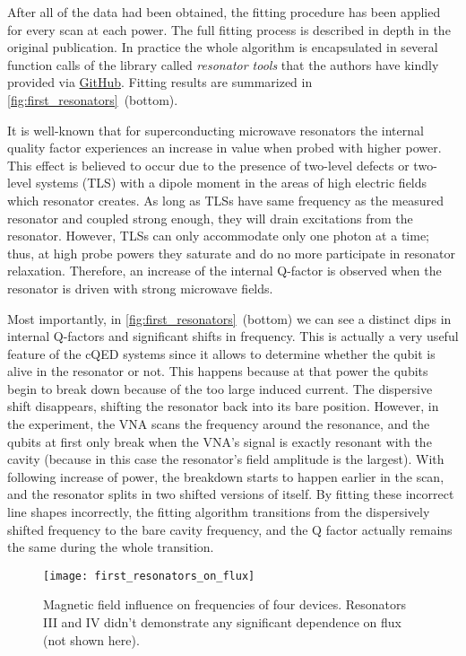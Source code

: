 \documentclass[12pt, twoside]{report}
\numberwithin{equation}{section}
\begin{document}
After all of the data had been obtained, the fitting procedure has been applied for every scan at each power. The full fitting process is described in depth in the original publication\cite{probst2015}. In practice the whole algorithm is encapsulated in several function calls of the library called \textit{resonator tools} that the authors have kindly provided via \href{https://github.com/sebastianprobst/resonatortools}{GitHub}. Fitting results are summarized in \autoref{fig:first_resonators}~(bottom).

It is well-known\cite{wang2009} that for superconducting microwave resonators the internal quality factor experiences an increase in value when probed with higher power. This effect is believed to occur due to the presence of two-level defects or two-level systems (TLS) with a dipole moment in the areas of high electric fields which resonator creates. As long as TLSs have same frequency as the measured resonator and coupled strong enough, they will drain excitations from the resonator. However, TLSs can only accommodate only one photon at a time; thus, at high probe powers they saturate and do no more participate in resonator relaxation. Therefore, an increase of the internal Q-factor is observed when the resonator is driven with strong microwave fields.

Most importantly, in \autoref{fig:first_resonators}~(bottom) we can see a distinct dips in internal Q-factors and significant shifts in frequency. This is actually a very useful feature of the cQED systems since it allows to determine whether the qubit is alive in the resonator or not. This happens because at that power the qubits begin to break down because of the too large induced current. The dispersive shift disappears, shifting the resonator back into its bare position. However, in the experiment, the VNA scans the frequency around the resonance, and the qubits at first only break when the VNA's signal is exactly resonant with the cavity (because in this case the resonator's field amplitude is the largest). With following increase of power, the breakdown starts to happen earlier in the scan, and the resonator splits in two shifted versions of itself. By fitting these incorrect line shapes incorrectly, the fitting algorithm transitions from the dispersively shifted frequency to the bare cavity frequency, and the Q factor actually remains the same during the whole transition. 

\begin{figure}
\centering
\texttt{[image: first\_resonators\_on\_flux]}
\caption{Magnetic field influence on frequencies of four devices. Resonators III and IV didn't demonstrate any significant dependence on flux (not shown here).}
\label{fig:first_resonators_on_flux}
\end{figure} 
\end{document}
